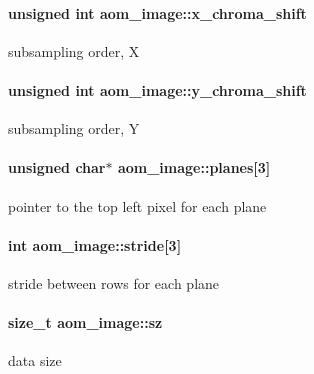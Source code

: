 \paragraph[{\texorpdfstring{x\+\_\+chroma\+\_\+shift}{x_chroma_shift}}]{\setlength{\rightskip}{0pt plus 5cm}unsigned int aom\+\_\+image\+::x\+\_\+chroma\+\_\+shift}\hypertarget{structaom__image_a83fdb3677275dc0e1e38701000447214}{}\label{structaom__image_a83fdb3677275dc0e1e38701000447214}
subsampling order, X 
\paragraph[{\texorpdfstring{y\+\_\+chroma\+\_\+shift}{y_chroma_shift}}]{\setlength{\rightskip}{0pt plus 5cm}unsigned int aom\+\_\+image\+::y\+\_\+chroma\+\_\+shift}\hypertarget{structaom__image_a5acfc850c272e1377f3b7d58a95f3749}{}\label{structaom__image_a5acfc850c272e1377f3b7d58a95f3749}
subsampling order, Y 
\paragraph[{\texorpdfstring{planes}{planes}}]{\setlength{\rightskip}{0pt plus 5cm}unsigned char$\ast$ aom\+\_\+image\+::planes\mbox{[}3\mbox{]}}\hypertarget{structaom__image_ac54dbc5237ca2914f9ec30105dfbe302}{}\label{structaom__image_ac54dbc5237ca2914f9ec30105dfbe302}
pointer to the top left pixel for each plane 
\paragraph[{\texorpdfstring{stride}{stride}}]{\setlength{\rightskip}{0pt plus 5cm}int aom\+\_\+image\+::stride\mbox{[}3\mbox{]}}\hypertarget{structaom__image_a6dc693d7dbc9eb06c0cdde307ca58372}{}\label{structaom__image_a6dc693d7dbc9eb06c0cdde307ca58372}
stride between rows for each plane 
\paragraph[{\texorpdfstring{sz}{sz}}]{\setlength{\rightskip}{0pt plus 5cm}size\+\_\+t aom\+\_\+image\+::sz}\hypertarget{structaom__image_af0f6c220bf000d1c488075c19d889290}{}\label{structaom__image_af0f6c220bf000d1c488075c19d889290}
data size 
